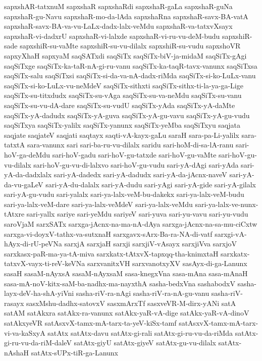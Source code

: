 {sapxshAR-tatxnuM
sapxshaR
sapxshaRdi
sapxshaR-gaLa
sapxshaR-guNa
sapxshaR-gu-Navu
sapxshaR-mo-da-lAda
sapxshaRna
sapxshaR-savx-BA-vatA
sapxshaR-savx-BA-va-vu-LaLx-dadx-lalx-veMdu
sapxshaR-va-tatxvXsayx
sapxshaR-vi-dadxrU
sapxshaR-vi-lalxde
sapxshaR-vi-ru-vu-deM-budu
sapxshiR-sade
sapxshiR-su-vaMte
sapxshiR-su-vu-dilalx
sapxshiR-su-vudu
sapxshoVR
sapxyXhaH
sapxyaM
saqSATxdi
saqSiTx
saqSiTx-biV-ja-midaM
saqSiTx-gAgi
saqSiTxge
saqSiTx-ka-taR-nA-gi-ru-vanu
saqSiTx-ka-taqR-tavx-vanunx
saqSiTxsa
saqSiTx-salu
saqSiTxsi
saqSiTx-si-da-va-nA-dadx-riMda
saqSiTx-si-ko-LuLx-vanu
saqSiTx-si-ko-LuLx-vu-neMdeV
saqSiTx-sithxti
saqSiTx-sithx-ti-la-ya-ga-Lige
saqSiTx-su-titxdudx
saqSiTx-su-vAga
saqSiTx-su-va-neMdu
saqSiTx-su-vanu
saqSiTx-su-vu-dA-dare
saqSiTx-su-vudU
saqSiTx-yAda
saqSiTx-yA-daMte
saqSiTx-yA-dadudx
saqSiTx-yA-guva
saqSiTx-yA-gu-vavu
saqSiTx-yA-gu-vudu
saqSiTxya
saqSiTx-yalilx
saqSiTx-yanunx
saqSiTx-yeMba
saqSiTxyu
saqjata
saqjate
saqjateV
saqjati
saqtayx
saqti-vA-kayx-gaLu
saraH
sara-pa-Li-yalilx
sara-tatxtA
sara-vanunx
sari
sari-ba-ru-vu-dilalx
saridu
sari-hoM-di-sa-lA-ranu
sari-hoV-ga-deMdu
sari-hoV-gadu
sari-hoV-gu-tatxde
sari-hoV-gu-vaMte
sari-hoV-gu-vu-dilalx
sari-hoV-gu-vu-di-lalxvo
sari-hoV-gu-vudu
sari-yA-dAgi
sari-yAda
sari-yA-da-dadxlalx
sari-yA-dadedx
sari-yA-dadudx
sari-yA-da-jAcnx-naveV
sari-yA-da-vu-gaLeV
sari-yA-du-dalalx
sari-yA-dudu
sari-yAgi
sari-yA-gide
sari-yA-gilalx
sari-yA-gu-vudu
sari-yalalx
sari-ya-lalx-veM-bu-dakekx
sari-ya-lalx-veM-budu
sari-ya-lalx-veM-dare
sari-ya-lalx-veMdeV
sari-ya-lalx-veMdu
sari-ya-lalx-ve-nunx-tAtxre
sari-yallx
sariye
sari-yeMdu
sariyeV
sari-yuva
sari-yu-vavu
sari-yu-vudu
saroVjaM
sarxSATx
sarxga-jAcnx-na-ma-nA-dAya
sarxga-jAcnx-na-sa-mu-ciCxtw
sarxga-vi-doyxV-tathx-va-sutxnaH
sarxgavx-sArx-Ba-ra-NA-di-vatf
sarxgi-vA-hAyx-di-rU-peVNa
sarxjA
sarxjaH
sarxji
sarxjiV-vAsayx
sarxjiVva
sarxjoV
sarxkasx-paR-ma-ya-tA-miva
sarxkatx-tAtxvX-tapxqq-tha-knimxtaH
sarxkatx-tatxvX-vayx-ti-reV-keVNa
sarxvanitxVH
sarxvanotxyXV
sasAyx-di-ga-Lanunx
sasaH
sasaM-nAyxsA
sasaM-nAyxsaM
sasa-knegxVna
sasa-mAna
sasa-mAnaH
sasa-mA-noV-kitx-saM-ba-nadhx-ma-nayxthA
sasha-bedxVna
sashabodxV
sasha-layx-deV-ha-shA-yiVni
sasha-riV-ra-nAgi
sasha-riV-ra-nA-gu-vanu
sasha-riV-rasayx
sasxMshu-dadhx-satovxV
sasxmArxTf
sasxveVR-M-dirx-yANi
satA
satAM
satAkxra
satAkx-ra-vanunx
satAkx-yaR-vA-dige
satAkx-yaR-vA-dinoV
satAkxyeVR
satAsxvX-tamx-mA-tarx-ta-yeV-kiSx-tamf
satAsxvX-tamx-mA-tarx-vi-va-kaSxyA
satAtx
satAtx-davu
satAtx-gi-rali
satAtx-gi-ru-vu-da-riMda
satAtx-gi-ru-vu-da-riM-daleV
satAtx-giyU
satAtx-giyeV
satAtx-gu-vu-dilalx
satAtx-nAshaH
satAtx-sUPx-tiR-ga-Lanunx
}
